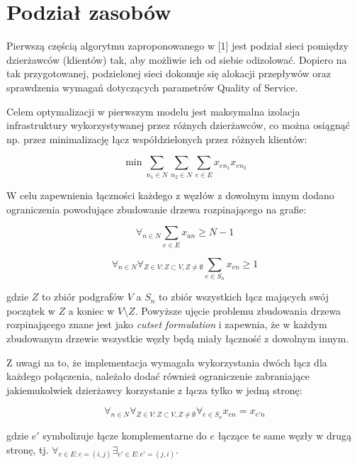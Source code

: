 \section{Podział zasobów}

Pierwszą częścią algorytmu zaproponowanego w [1] jest podział sieci pomiędzy dzierżawców (klientów) tak, aby możliwie ich od siebie odizolować. Dopiero na tak przygotowanej, podzielonej sieci dokonuje się alokacji przepływów oraz sprawdzenia wymagań dotyczących parametrów Quality of Service. \newline

Celem optymalizacji w pierwszym modelu jest maksymalna izolacja infrastruktury wykorzystywanej przez różnych dzierżawców, co można osiągnąć np. przez minimalizację łącz współdzielonych przez różnych klientów:

\begin{equation}
  \min \sum_{n_{1} \in N} \sum_{n_{2} \in N} \sum_{e \in E} x_{en_{1}} x_{en_{2}}
\end{equation}

W celu zapewnienia łączności każdego z węzłów z dowolnym innym dodano ograniczenia powodujące zbudowanie drzewa rozpinającego na grafie:

\begin{equation}
  \forall_{n \in N} \sum_{e \in E} x_{an} \ge N-1
\end{equation}

\begin{equation}
  \forall_{n \in N} \forall_{Z \in V: Z \subset V, Z \neq \emptyset } \sum_{e \in S_{n}} x_{en} \ge 1
\end{equation}

gdzie $Z$ to zbiór podgrafów $V$ a $S_{n}$ to zbiór wszystkich łącz mających swój początek w $Z$ a koniec w $V \setminus Z$. Powyższe ujęcie problemu zbudowania drzewa rozpinającego znane jest jako \textit{cutset formulation} i zapewnia, że w każdym zbudowanym drzewie wszystkie węzły będą miały łączność z dowolnym innym.

Z uwagi na to, że implementacja wymagała wykorzystania dwóch łącz dla każdego połączenia, należało dodać również ograniczenie zabraniające jakiemukolwiek dzierżawcy korzystanie z łącza tylko w jedną stronę:

\begin{equation}
  \forall_{n \in N} \forall_{Z \in V: Z \subset V, Z \neq \emptyset } \forall_{e \in S_{n}} x_{en} = x_{e'n}
\end{equation}

gdzie ${e'}$ symbolizuje łącze komplementarne do ${e}$ łączące te same węzły w drugą stronę, tj. $\forall_{e \in E: e = (i,j)} \exists_{e' \in E: e' = (j,i)}$.
